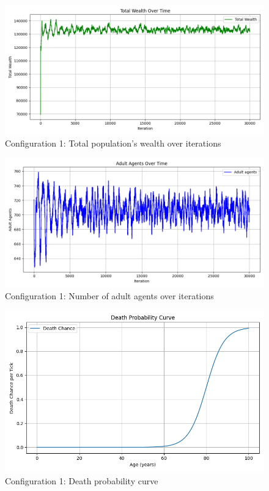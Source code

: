 \documentclass[english]{projectreport}
\begin{document}
    \begin{figure}[H]
        \centering
        \includegraphics[width=0.8\linewidth]{metrics_config1/metrics_config1_total_wealth.png}
        \caption{Configuration 1: Total population's wealth over iterations}
        \label{fig:c0-total_wealth}
    \end{figure}

    \begin{figure}[H]
        \centering
        \includegraphics[width=0.8\linewidth]{metrics_config1/metrics_config1_adult_agents.png}
        \caption{Configuration 1: Number of adult agents over iterations}
        \label{fig:c0-adult_agents}
    \end{figure}

    \begin{figure}[H]
        \centering
        \includegraphics[width=0.8\linewidth]{metrics_config1/metrics_config1_death_probability_curve.png}
        \caption{Configuration 1: Death probability curve}
        \label{fig:c0-death_probability_curve}
    \end{figure}
\end{document}
